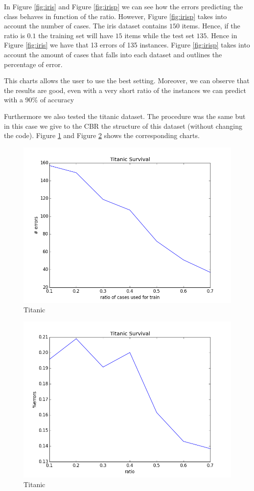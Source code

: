 \documentclass[11pt]{article}
\begin{document}
In Figure \ref{fig:iris} and Figure \ref{fig:irisp} we can see how the errors predicting the class behaves in function of the ratio. However, Figure \ref{fig:irisp} takes into account the number of cases. The iris dataset contains $150$ items. Hence, if the ratio is $0.1$ the training set will have $15$ items while the test set $135$. Hence in Figure \ref{fig:iris} we have that 13 errors of 135 instances. Figure \ref{fig:irisp} takes into account the amount of cases that falls into each dataset and outlines the percentage of error.

This charts allows the user to use the best setting. Moreover, we can observe that the results are good, even with a very short ratio of the instances we can predict with a 90\% of accuracy

Furthermore we also tested the titanic dataset. The procedure was the same but in this case we give to the CBR the structure of this dataset (without changing the code). Figure \ref{fig:t} and Figure \ref{fig:tp} shows the corresponding charts.

\begin{figure}[htb]
    \center
    \includegraphics[width=0.7\linewidth]{images/titanic}
    \caption{Titanic}
    \label{fig:t}
\end{figure}

\begin{figure}[htb]
    \center
    \includegraphics[width=0.7\linewidth]{images/titanic_p_bo}
    \caption{Titanic}
    \label{fig:tp}
\end{figure}
\end{document}
